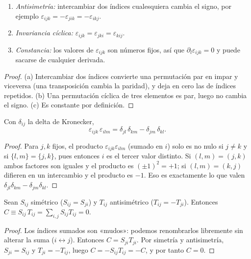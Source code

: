 \begin{lema}\label{lema:levi}
\begin{enumerate}[label=(\alph*)]
  \item \emph{Antisimetría:} intercambiar dos índices cualesquiera cambia el
        signo, por ejemplo $\varepsilon_{ijk}=-\varepsilon_{jik}=-\varepsilon_{ikj}$.
  \item \emph{Invariancia cíclica:} $\varepsilon_{ijk}=\varepsilon_{jki}=\varepsilon_{kij}$.
  \item \emph{Constancia:} los valores de $\varepsilon_{ijk}$ son números fijos, así
        que $\partial_l\varepsilon_{ijk}=0$ y puede sacarse de cualquier derivada.
\end{enumerate}
\end{lema}
\begin{proof}
(a) Intercambiar dos índices convierte una permutación par en impar y viceversa
(una transposición cambia la paridad), y deja en cero las de índices repetidos.
(b) Una permutación cíclica de tres elementos es par, luego no cambia el signo.
(c) Es constante por definición.
\end{proof}

\begin{lema}\label{lema:eps-delta}
Con $\delta_{ij}$ la delta de Kronecker,
\[
  \varepsilon_{ijk}\,\varepsilon_{ilm}=\delta_{jl}\,\delta_{km}-\delta_{jm}\,\delta_{kl}.
\]
\end{lema}
\begin{proof}
Para $j,k$ fijos, el producto $\varepsilon_{ijk}\varepsilon_{ilm}$ (sumado en $i$) solo
es no nulo si $j\neq k$ y si $\{l,m\}=\{j,k\}$, pues entonces $i$ es el tercer
valor distinto. Si $(l,m)=(j,k)$ ambos factores son iguales y el producto es
$(\pm1)^{2}=+1$; si $(l,m)=(k,j)$ difieren en un intercambio y el producto es
$-1$. Eso es exactamente lo que valen $\delta_{jl}\delta_{km}-\delta_{jm}\delta_{kl}$.
\end{proof}

\begin{lema}\label{lema:sim-anti}
Sean $S_{ij}$ simétrico ($S_{ij}=S_{ji}$) y $T_{ij}$ antisimétrico
($T_{ij}=-T_{ji}$). Entonces $C\equiv S_{ij}\,T_{ij}=\sum_{i,j}S_{ij}T_{ij}=0$.
\end{lema}
\begin{proof}
Los índices sumados son «mudos»: podemos renombrarlos libremente sin alterar la
suma ($i\leftrightarrow j$). Entonces
$C=S_{ji}T_{ji}$. Por simetría y antisimetría, $S_{ji}=S_{ij}$ y $T_{ji}=-T_{ij}$, luego
$C=-S_{ij}T_{ij}=-C$, y por tanto $C=0$.
\end{proof}

